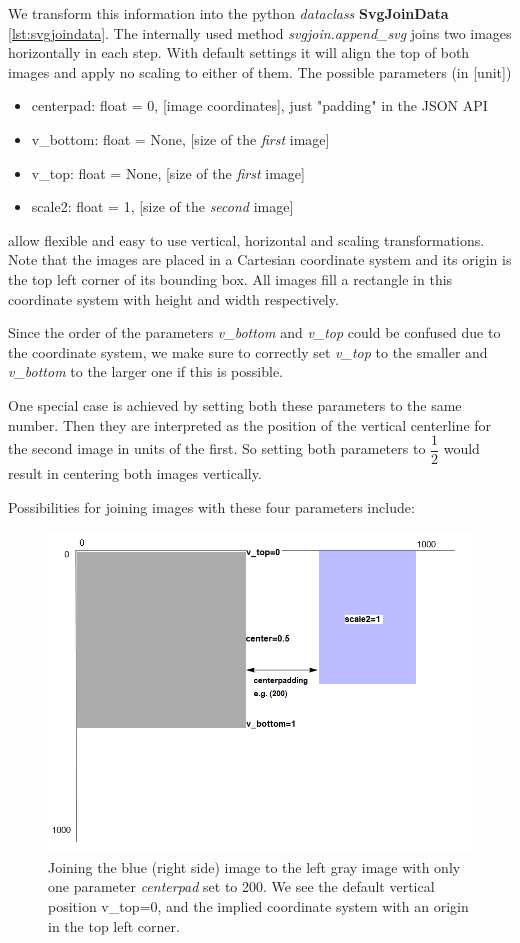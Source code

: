 \documentclass[a4paper, 12pt]{scrartcl}
\begin{document}
We transform this information into the python \textit{dataclass} \textbf{SvgJoinData} \ref{lst:svgjoindata}.
The internally used method \textit{svgjoin.append\_svg} joins two images horizontally in each step.
With default settings it will align the top of both images and apply no scaling to either of them.
The possible parameters (in [unit])
\begin{itemize}
	\item centerpad: float = 0, [image coordinates], just "padding" in the JSON API
	\item v\_bottom: float = None, [size of the \textit{first} image]
	\item v\_top: float = None, [size of the \textit{first} image]
	\item scale2: float = 1, [size of the \textit{second} image]
\end{itemize}
allow flexible and easy to use vertical, horizontal and scaling transformations.
Note that the images are placed in a Cartesian coordinate system and its origin is the top left corner of its bounding box. All images fill a rectangle in this coordinate system with height and width respectively.

Since the order of the parameters \textit{v\_bottom} and \textit{v\_top} could be confused due to the coordinate system, we make sure to correctly set \textit{v\_top} to the smaller and \textit{v\_bottom} to the larger one if this is possible.

One special case is achieved by setting both these parameters to the same number. Then they are interpreted as the position of the vertical centerline for the second image in units of the first. So setting both parameters to $\dfrac{1}{2}$ would result in centering both images vertically.

Possibilities for joining images with these four parameters include:

\begin{figure}[H]
	\centering
	\includegraphics[width=0.8\linewidth]{images/svgjoinpad200.png}
	\caption{Joining the blue (right side) image to the left gray image with only one parameter \textit{centerpad} set to 200. We see the default vertical position v\_top=0, and the implied coordinate system with an origin in the top left corner.}
	\label{fig:svgjoinpad200}
\end{figure}
\end{document}
